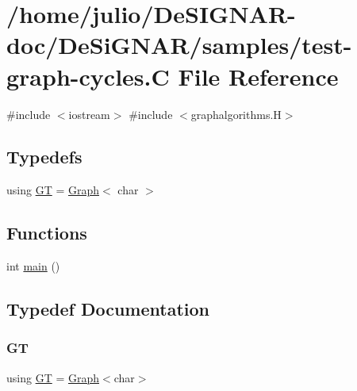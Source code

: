 \hypertarget{test-graph-cycles_8_c}{}\section{/home/julio/\+De\+S\+I\+G\+N\+A\+R-\/doc/\+De\+Si\+G\+N\+A\+R/samples/test-\/graph-\/cycles.C File Reference}
\label{test-graph-cycles_8_c}
{\ttfamily \#include $<$iostream$>$}\newline
{\ttfamily \#include $<$graphalgorithms.\+H$>$}\newline
\subsection*{Typedefs}
\begin{DoxyCompactItemize}
\item 
using \hyperlink{test-graph-cycles_8_c_a867adda87f9db275997db57644adc40f}{GT} = \hyperlink{class_designar_1_1_graph}{Graph}$<$ char $>$
\end{DoxyCompactItemize}
\subsection*{Functions}
\begin{DoxyCompactItemize}
\item 
int \hyperlink{test-graph-cycles_8_c_ae66f6b31b5ad750f1fe042a706a4e3d4}{main} ()
\end{DoxyCompactItemize}


\subsection{Typedef Documentation}
\mbox{\label{test-graph-cycles_8_c_a867adda87f9db275997db57644adc40f}} 
\subsubsection{\texorpdfstring{GT}{GT}}
{\footnotesize\ttfamily using \hyperlink{demo-buildgraph_8_c_a3001c40d2c31ca87ed96cd7d1334a55e}{GT} =  \hyperlink{class_designar_1_1_graph}{Graph}$<$char$>$}




